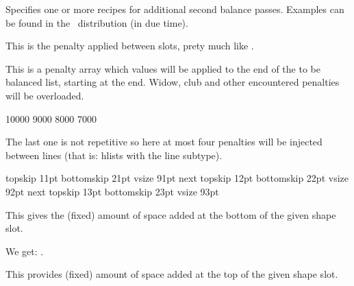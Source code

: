 \stopnewprimitive

\startnewprimitive[title={\prm {balancepasses}}]

Specifies one or more recipes for additional second balance passes. Examples
can be found in the \CONTEXT\ distribution (in due time).

\stopnewprimitive

\startnewprimitive[title={\prm {balancepenalty}}]

This is the penalty applied between slots, prety much like .

\stopnewprimitive

\startnewprimitive[title={\prm {balancefinalpenalties}}]

This is a penalty array which values will be applied to the end of the to be
balanced list, starting at the end. Widow, club and other encountered penalties
will be overloaded.

\starttyping
{}
    10000 9000 8000 7000
\relax
\stoptyping

The last one is not repetitive so here at most four penalties will be injected
between lines (that is: hlists with the line subtype).

\stopnewprimitive

\startnewprimitive[title={\prm {balanceshape}}]

\startbuffer[shape]
    topskip 11pt bottomskip 21pt vsize 91pt next
    topskip 12pt bottomskip 22pt vsize 92pt next
    topskip 13pt bottomskip 23pt vsize 93pt
\relax
\stopbuffer

\stopnewprimitive

\startnewprimitive[title={\prm {balanceshapebottomspace}}]

This gives the (fixed) amount of space added at the bottom of the given shape
slot.

\startbuffer
\the{} \space
\the{}
\stopbuffer

\typebuffer

\start \getbuffer[shape] We get: {\inlinebuffer}. \stop

\stopnewprimitive

\startnewprimitive[title={\prm {balanceshapetopspace}}]

This provides (fixed) amount of space added at the top of the given shape slot.

\startbuffer
\the{} \space
\the{}
\stopbuffer

